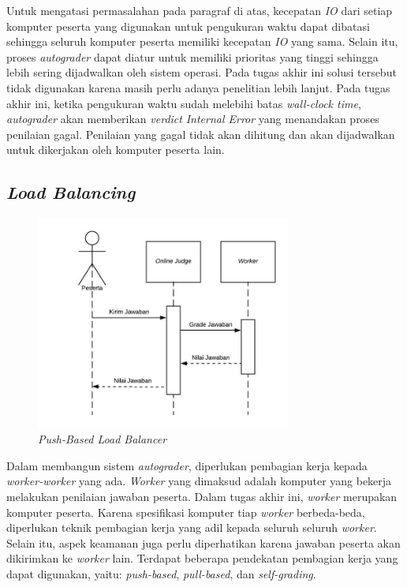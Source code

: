 \par Untuk mengatasi permasalahan pada paragraf di atas, kecepatan \textit{IO} dari setiap komputer peserta yang digunakan untuk pengukuran waktu dapat dibatasi sehingga seluruh komputer peserta memiliki kecepatan \textit{IO} yang sama. Selain itu, proses \textit{autograder} dapat diatur untuk memiliki prioritas yang tinggi sehingga lebih sering dijadwalkan oleh sistem operasi. Pada tugas akhir ini solusi tersebut tidak digunakan karena masih perlu adanya penelitian lebih lanjut. Pada tugas akhir ini, ketika pengukuran waktu sudah melebihi batas \textit{wall-clock time}, \textit{autograder} akan memberikan \textit{verdict} \textit{Internal Error} yang menandakan proses penilaian gagal. Penilaian yang gagal tidak akan dihitung dan akan dijadwalkan untuk dikerjakan oleh komputer peserta lain. 

\subsection{\textit{Load Balancing}}

\begin{figure}[ht!]
    \centering
    \includegraphics[width=0.75\textwidth]{images/load-balancing-push}
    \caption{\textit{Push-Based Load Balancer}}
    \label{fig:load-balancing-push}
\end{figure}

\par Dalam membangun sistem \textit{autograder}, diperlukan pembagian kerja kepada \textit{worker-worker} yang ada. \textit{Worker} yang dimaksud adalah komputer yang bekerja melakukan penilaian jawaban peserta. Dalam tugas akhir ini, \textit{worker} merupakan komputer peserta. Karena spesifikasi komputer tiap \textit{worker} berbeda-beda, diperlukan teknik pembagian kerja yang adil kepada seluruh seluruh \textit{worker}. Selain itu, aspek keamanan juga perlu diperhatikan karena jawaban peserta akan dikirimkan ke \textit{worker} lain. Terdapat beberapa pendekatan pembagian kerja yang dapat digunakan, yaitu: \textit{push-based}, \textit{pull-based}, dan \textit{self-grading}.

